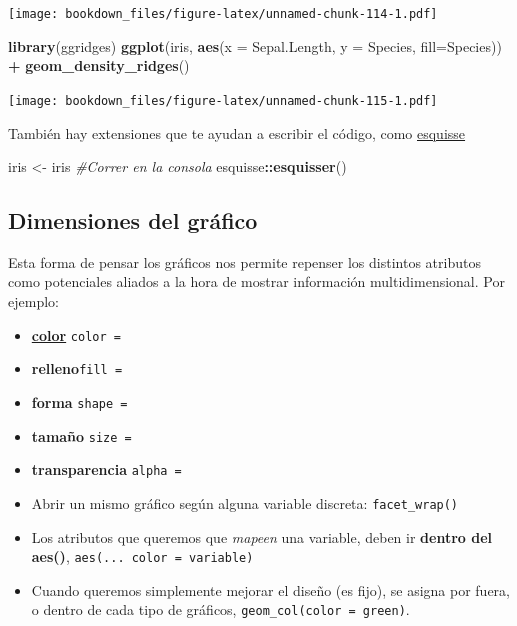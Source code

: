 \documentclass[]{book}
\newenvironment{Shaded}{\begin{snugshade}}{\end{snugshade}}
\newcommand{\CommentTok}[1]{\textcolor[rgb]{0.56,0.35,0.01}{\textit{#1}}}
\newcommand{\DataTypeTok}[1]{\textcolor[rgb]{0.13,0.29,0.53}{#1}}
\newcommand{\KeywordTok}[1]{\textcolor[rgb]{0.13,0.29,0.53}{\textbf{#1}}}
\newcommand{\NormalTok}[1]{#1}
\newcommand{\OperatorTok}[1]{\textcolor[rgb]{0.81,0.36,0.00}{\textbf{#1}}}
\newcommand{\StringTok}[1]{\textcolor[rgb]{0.31,0.60,0.02}{#1}}
\begin{document}
\texttt{[image: bookdown\_files/figure-latex/unnamed-chunk-114-1.pdf]}

\begin{Shaded}
\begin{Highlighting}[]
\KeywordTok{library}\NormalTok{(ggridges)}
\KeywordTok{ggplot}\NormalTok{(iris, }\KeywordTok{aes}\NormalTok{(}\DataTypeTok{x =}\NormalTok{ Sepal.Length, }\DataTypeTok{y =}\NormalTok{ Species, }\DataTypeTok{fill=}\NormalTok{Species)) }\OperatorTok{+}\StringTok{ }
\StringTok{  }\KeywordTok{geom_density_ridges}\NormalTok{()}
\end{Highlighting}
\end{Shaded}

\texttt{[image: bookdown\_files/figure-latex/unnamed-chunk-115-1.pdf]}

También hay extensiones que te ayudan a escribir el código, como \href{https://dreamrs.github.io/esquisse/}{esquisse}

\begin{Shaded}
\begin{Highlighting}[]
\NormalTok{iris <-}\StringTok{ }\NormalTok{iris}
\CommentTok{#Correr en la consola}
\NormalTok{esquisse}\OperatorTok{::}\KeywordTok{esquisser}\NormalTok{()}
\end{Highlighting}
\end{Shaded}

\hypertarget{dimensiones-del-grafico}{%
\subsection{Dimensiones del gráfico}\label{dimensiones-del-grafico}}

Esta forma de pensar los gráficos nos permite repenser los distintos atributos como potenciales aliados a la hora de mostrar información multidimensional. Por ejemplo:

\begin{itemize}
\item
  \href{http://www.stat.columbia.edu/~tzheng/files/Rcolor.pdf}{\textbf{color}} \texttt{color\ =}
\item
  \textbf{relleno}\texttt{fill\ =}
\item
  \textbf{forma} \texttt{shape\ =}
\item
  \textbf{tamaño} \texttt{size\ =}
\item
  \textbf{transparencia} \texttt{alpha\ =}
\item
  Abrir un mismo gráfico según alguna variable discreta: \texttt{facet\_wrap()}
\item
  Los atributos que queremos que \emph{mapeen} una variable, deben ir \textbf{dentro del aes()}, \texttt{aes(...\ color\ =\ variable)}
\item
  Cuando queremos simplemente mejorar el diseño (es fijo), se asigna por fuera, o dentro de cada tipo de gráficos, \texttt{geom\_col(color\ =\ \textquotesingle{}green\textquotesingle{})}.
\end{itemize}
\end{document}
